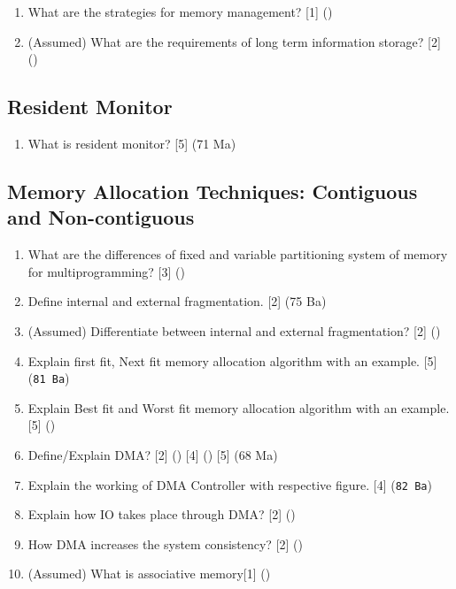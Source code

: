 \documentclass[12pt]{article}
\begin{document}
	\begin{enumerate}[noitemsep, topsep=0pt]
		\item What are the strategies for memory management? \hfill [1] ()

		\item (Assumed) What are the requirements of long term information storage? \hfill [2] ()
	\end{enumerate}

	\subsection{Resident Monitor}
		\begin{enumerate}[noitemsep, topsep=0pt]
			\item What is resident monitor? \hfill [5] (71 Ma)
		\end{enumerate}
	
	\subsection{Memory Allocation Techniques: Contiguous and Non-contiguous}
		\begin{enumerate}[noitemsep, topsep=0pt]
			\item What are the differences of fixed and variable partitioning system of memory for multiprogramming? \hspace{12cm} [3] ()

			\item Define internal and external fragmentation. \hfill [2] (75 Ba)

			\item (Assumed) Differentiate between internal and external fragmentation? \hfill [2] ()
		
			\item Explain first fit, Next fit memory allocation algorithm with an example. \hfill [5] (\texttt{81 Ba})

			\item Explain Best fit and Worst fit memory allocation algorithm with an example. \hfill [5] ()

			\item Define/Explain DMA? \hfill [2] () [4] () [5] (68 Ma)
			
			\item Explain the working of DMA Controller with respective figure. \hfill [4] (\texttt{82 Ba})

			\item Explain how IO takes place through DMA? \hfill [2] ()

			\item How DMA increases the system consistency? \hfill [2] ()

			\item (Assumed) What is associative memory\hfill [1] ()
		\end{enumerate}
		
\end{document}
